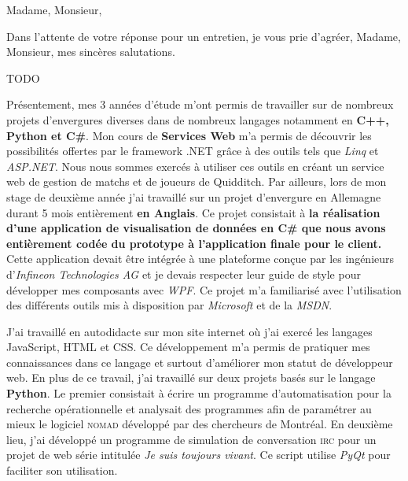 \date{\today}
\opening{Madame, Monsieur,}
\closing{Dans l'attente de votre réponse pour un entretien, je vous prie d'agréer, Madame, Monsieur, mes sincères salutations.}

\makelettertitle

\introduction{}
TODO

Présentement, mes 3 années d'étude m'ont permis de travailler sur de nombreux projets d'envergures diverses dans de nombreux langages notamment en \textbf{C++, Python et C\#}. Mon cours de \textbf{Services Web} m'a permis de découvrir les possibilités offertes par le framework .NET grâce à des outils tels que \textit{Linq} et \textit{ASP.NET}. Nous nous sommes exercés à utiliser ces outils en créant un service web de gestion de matchs et de joueurs de Quidditch. Par ailleurs, lors de mon stage de deuxième année j'ai travaillé sur un projet d'envergure en Allemagne durant 5 mois entièrement \textbf{en Anglais}. Ce projet consistait à \textbf{la réalisation d'une application de visualisation de données en C\# que nous avons entièrement codée du prototype à l'application finale pour le client.} Cette application devait être intégrée à une plateforme conçue par les ingénieurs d'\textit{Infineon Technologies AG} et je devais respecter leur guide de style pour développer mes composants avec \textit{WPF}. Ce projet m'a familiarisé avec l'utilisation des différents outils mis à disposition par \textit{Microsoft} et de la \textit{MSDN}.

J'ai travaillé en autodidacte sur mon site internet où j'ai exercé les langages JavaScript, HTML et CSS. Ce développement m'a permis de pratiquer mes connaissances dans ce langage et surtout d'améliorer mon statut de développeur web. En plus de ce travail, j'ai travaillé sur deux projets basés sur le langage \textbf{Python}. Le premier consistait à écrire un programme d'automatisation pour la recherche opérationnelle et analysait des programmes afin de paramétrer au mieux le logiciel \textsc{nomad} développé par des chercheurs de Montréal. En deuxième lieu, j'ai développé un programme de simulation de conversation \textsc{irc} pour un projet de web série intitulée \textit{Je suis toujours vivant}. Ce script utilise \textit{PyQt} pour faciliter son utilisation. \conclusion{}


\makeletterclosing
